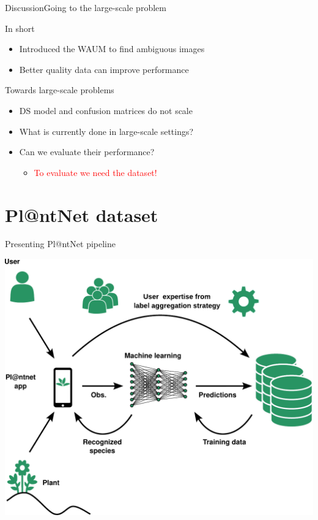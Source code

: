 \begin{frame}{Discussion}{Going to the large-scale problem}
\begin{block}{In short}
\begin{itemize}
    \item Introduced the WAUM to find ambiguous images
    \item Better quality data can improve performance
\end{itemize}
\end{block}

\pause
\begin{block}{Towards large-scale problems}
\begin{itemize}
    \item DS model and confusion matrices do not scale
    \item What is currently done in large-scale settings?
    \item Can we evaluate their performance?
    \begin{itemize}
    \item<3> \textcolor{red}{To evaluate we need the dataset!}
    \end{itemize}
\end{itemize}
\end{block}

\end{frame}

\section{Pl@ntNet dataset}

\begin{frame}{Presenting Pl@ntNet pipeline}
\begin{center}
    \includegraphics[width=.85\textwidth]{../chapters/images/plantnet_schema_global_green.pdf}
\end{center}
\end{frame}


